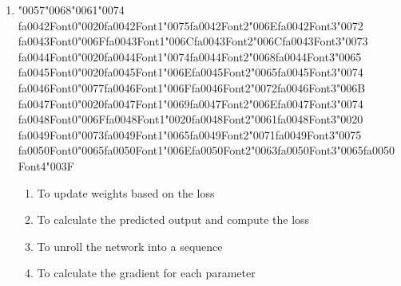 \documentclass[12pt]{article}
\begin{document}
\begin{enumerate}[label=Q\arabic*.]
\begin{enumerate}[label=(\Alph*)]
\end{enumerate}
\item {\char"0057}{\char"0068}{\char"0061}{\char"0074} {\csname fa0042Font0\endcsname\char"0020}{\csname fa0042Font1\endcsname\char"0075}{\csname fa0042Font2\endcsname\char"006E}{\csname fa0042Font3\endcsname\char"0072} {\csname fa0043Font0\endcsname\char"006F}{\csname fa0043Font1\endcsname\char"006C}{\csname fa0043Font2\endcsname\char"006C}{\csname fa0043Font3\endcsname\char"0073} {\csname fa0044Font0\endcsname\char"0020}{\csname fa0044Font1\endcsname\char"0074}{\csname fa0044Font2\endcsname\char"0068}{\csname fa0044Font3\endcsname\char"0065} {\csname fa0045Font0\endcsname\char"0020}{\csname fa0045Font1\endcsname\char"006E}{\csname fa0045Font2\endcsname\char"0065}{\csname fa0045Font3\endcsname\char"0074} {\csname fa0046Font0\endcsname\char"0077}{\csname fa0046Font1\endcsname\char"006F}{\csname fa0046Font2\endcsname\char"0072}{\csname fa0046Font3\endcsname\char"006B} {\csname fa0047Font0\endcsname\char"0020}{\csname fa0047Font1\endcsname\char"0069}{\csname fa0047Font2\endcsname\char"006E}{\csname fa0047Font3\endcsname\char"0074} {\csname fa0048Font0\endcsname\char"006F}{\csname fa0048Font1\endcsname\char"0020}{\csname fa0048Font2\endcsname\char"0061}{\csname fa0048Font3\endcsname\char"0020} {\csname fa0049Font0\endcsname\char"0073}{\csname fa0049Font1\endcsname\char"0065}{\csname fa0049Font2\endcsname\char"0071}{\csname fa0049Font3\endcsname\char"0075} {\csname fa0050Font0\endcsname\char"0065}{\csname fa0050Font1\endcsname\char"006E}{\csname fa0050Font2\endcsname\char"0063}{\csname fa0050Font3\endcsname\char"0065}{\csname fa0050Font4\endcsname\char"003F}
\begin{enumerate}[label=(\Alph*)]
    \item To update weights based on the loss
    \item To calculate the predicted output and compute the loss
    \item To unroll the network into a sequence
    \item To calculate the gradient for each parameter
\end{enumerate}

\end{enumerate}
\end{document}
